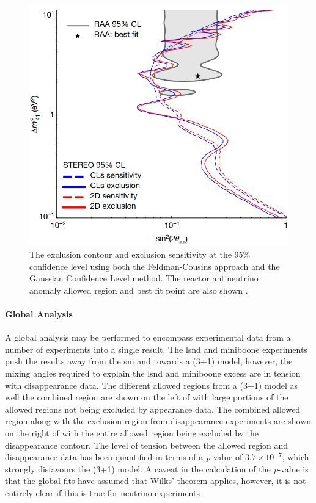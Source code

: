 \begin{figure}[h!]
    \centering
    \includegraphics[width = \mediumfigwidth]{figures-chap2/stereo.png}
    \caption[\gls{stereo} exclusion sensitivity at the 95\% confidence level.]{The exclusion contour and exclusion sensitivity at the 95\% confidence level using both the Feldman-Cousins approach and the Gaussian Confidence Level method. The reactor antineutrino anomaly allowed region and best fit point are also shown \cite{STEREO}.}
    \label{fig:stereo_exclusion_contour}
\end{figure}


\newpage
\paragraph{Global Analysis}
A global analysis may be performed to encompass experimental data from a number of experiments into a single result. The \gls{lsnd} and \gls{miniboone} experiments push the results away from the \gls{sm} and towards a (3+1) model, however, the mixing angles required to explain the \gls{lsnd} and \gls{miniboone} excess are in tension with \numu disappearance data. The different allowed regions from a (3+1) model as well the combined region are shown on the left of  with large portions of the allowed regions not being excluded by appearance data. The combined allowed region along with the exclusion region from disappearance experiments are shown on the right of  with the entire allowed region being excluded by the disappearance contour. The level of tension between the allowed region and disappearance data has been quantified in terms of a \textit{p}-value of $3.7 \times 10^{-7}$, which strongly disfavours the (3+1) model. A caveat in the calculation of the \textit{p}-value is that the global fits have assumed that Wilks' theorem applies, however, it is not entirely clear if this is true for neutrino experiments \cite{snowmass_2021}\cite{wilks_theorem}. 

